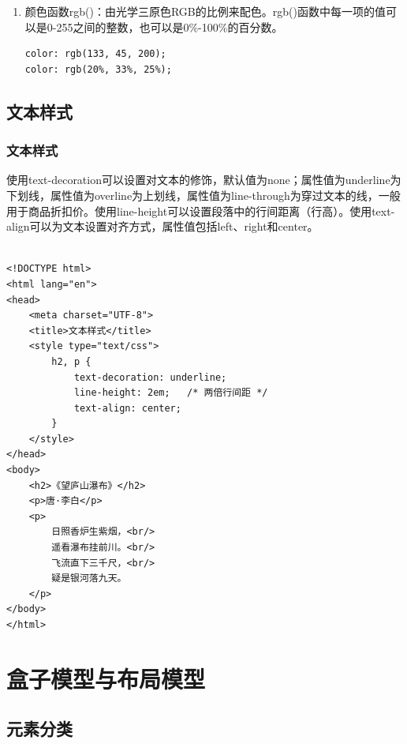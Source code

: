 \begin{enumerate}
	\item 颜色函数rgb()：由光学三原色RGB的比例来配色。rgb()函数中每一项的值可以是0-255之间的整数，也可以是0\%-100\%的百分数。\\
	      \begin{lstlisting}[style=htmlcssjs]
color: rgb(133, 45, 200);
color: rgb(20%, 33%, 25%);
    \end{lstlisting}
\end{enumerate}

\newpage

\section{文本样式}

\subsection{文本样式}

使用text-decoration可以设置对文本的修饰，默认值为none；属性值为underline为下划线，属性值为overline为上划线，属性值为line-through为穿过文本的线，一般用于商品折扣价。使用line-height可以设置段落中的行间距离（行高）。使用text-align可以为文本设置对齐方式，属性值包括left、right和center。\\

\\

\begin{lstlisting}[style=htmlcssjs]
<!DOCTYPE html>
<html lang="en">
<head>
    <meta charset="UTF-8">
    <title>文本样式</title>
    <style type="text/css">
        h2, p {
            text-decoration: underline;
            line-height: 2em;   /* 两倍行间距 */
            text-align: center;
        }
    </style>
</head>
<body>
    <h2>《望庐山瀑布》</h2>
    <p>唐·李白</p>
    <p>
        日照香炉生紫烟，<br/>
        遥看瀑布挂前川。<br/>
        飞流直下三千尺，<br/>
        疑是银河落九天。
    </p>
</body>
</html>
\end{lstlisting}

\newpage

\chapter{盒子模型与布局模型}

\section{元素分类}

